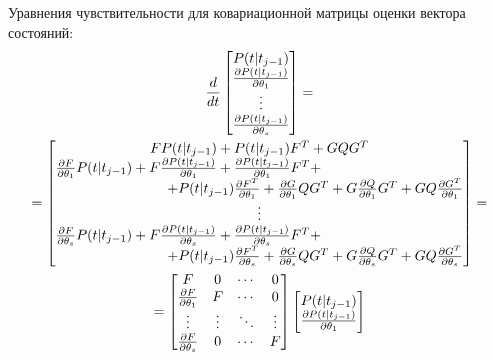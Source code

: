 \documentclass[a4paper,14pt]{extarticle}
\begin{document}
Уравнения чувствительности для ковариационной матрицы оценки вектора состояний:
\begin{multline}
	\label{eq:senscov}
	\frac{d}{dt}
	\begin{bmatrix}
		P(t|t_{j-1}) \\
		\frac{\partial P(t|t_{j-1})}{\partial \theta_1} \\
		\vdots \\
		\frac{\partial P(t|t_{j-1})}{\partial \theta_s}
	\end{bmatrix} = \\
	= \begin{bmatrix}
		F P(t|t_{j-1}) + P(t|t_{j-1}) F^T + G Q G^T \\
		\frac{\partial F}{\partial \theta_1} P(t|t_{j-1}) +
			F \frac{\partial P(t|t_{j-1})}{\partial \theta_1} +
			\frac{\partial P(t|t_{j-1})}{\partial \theta_1} F^T + \hspace{\fill} \\
			\hspace{8em} + P(t|t_{j-1}) \frac{\partial F^T}{\partial \theta_1} +
			\frac{\partial G}{\partial \theta_1} Q G^T +
			G \frac{\partial Q}{\partial \theta_1} G^T +
			G Q \frac{\partial G^T}{\partial \theta_1} \\
		\vdots \\
		\frac{\partial F}{\partial \theta_s} P(t|t_{j-1}) +
			F \frac{\partial P(t|t_{j-1})}{\partial \theta_s} +
			\frac{\partial P(t|t_{j-1})}{\partial \theta_s} F^T + \hspace{\fill} \\
			\hspace{8em} + P(t|t_{j-1}) \frac{\partial F^T}{\partial \theta_s} +
			\frac{\partial G}{\partial \theta_s} Q G^T +
			G \frac{\partial Q}{\partial \theta_s} G^T +
			G Q \frac{\partial G^T}{\partial \theta_s}
	\end{bmatrix}  = \\
	= \begin{bmatrix}
		F & 0 & \cdots & 0 \\
		\frac{\partial F}{\partial \theta_1} & F & \cdots & 0 \\
		\vdots & \vdots & \ddots & \vdots \\
		\frac{\partial F}{\partial \theta_s} & 0 & \cdots & F \\
	\end{bmatrix}
	\begin{bmatrix}
		P(t|t_{j-1}) \\
		\frac{\partial P(t|t_{j-1})}{\partial \theta_1} \\

\end{bmatrix}
\end{multline}
\end{document}
